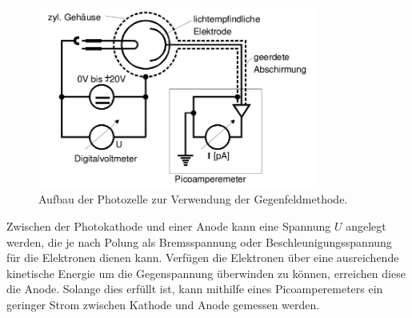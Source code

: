 \begin{figure}
  \centering
  \includegraphics[height=6cm]{ressources/aufbau_3.png}
  \caption{Aufbau der Photozelle zur Verwendung der Gegenfeldmethode. \cite{skript}}
  \label{abb:3}
\end{figure}

Zwischen der Photokathode und einer Anode kann eine Spannung $U$ angelegt werden, die je nach Polung als Bremsspannung oder Beschleunigungsspannung für die Elektronen dienen kann.
Verfügen die Elektronen über eine ausreichende kinetische Energie um die Gegenspannung überwinden zu können, erreichen diese die Anode.
Solange dies erfüllt ist, kann mithilfe eines Picoamperemeters ein geringer Strom zwischen Kathode und Anode gemessen werden.
